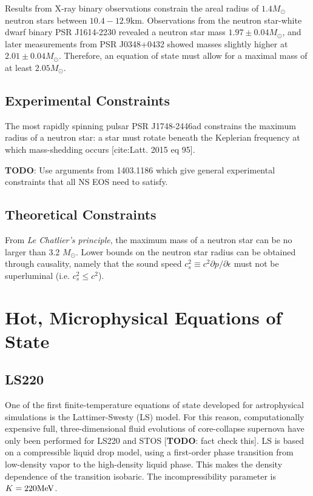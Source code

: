 Results from X-ray binary observations constrain the areal radius of $1.4M_\odot$ neutron stars between $10.4 - 12.9 \textrm{km}$.
Observations from the neutron star-white dwarf binary PSR J1614-2230 revealed a neutron star mass $1.97 \pm 0.04 M_\odot$, and later measurements from PSR J0348+0432 showed masses slightly higher at  $2.01 \pm 0.04 M_\odot$.  Therefore, an equation of state must allow for a maximal mass of at least $2.05 M_{\odot}$.

\subsection{Experimental Constraints}

The most rapidly spinning pulsar PSR J1748-2446ad constrains the maximum radius of a neutron star: a star must rotate beneath the Keplerian frequency at which mass-shedding occurs [cite:Latt. 2015 eq 95].

\textbf{TODO}: Use arguments from 1403.1186 which give general experimental constraints that all NS EOS need to satisfy. 

\subsection{Theoretical Constraints}

From \textit{Le Chatlier's principle}, the maximum mass of a neutron star can be no larger than 3.2 $M_\odot$.  Lower bounds on the neutron star radius can be obtained through causality, namely that the sound speed $c_s^2 \equiv c^2 \partial p / \partial \epsilon$ must not be superluminal (i.e. $c_s^2 \le c^2$).  

\section{Hot, Microphysical Equations of State}
\label{sec:nuclear-eos}

\subsection{LS220}
\label{sec:ls220}

One of the first finite-temperature equations of state developed for astrophysical simulations is the Lattimer-Swesty (LS) model.  For this reason, computationally expensive full, three-dimensional fluid evolutions of core-collapse supernova have only been performed for LS220 and STOS [\textbf{TODO}: fact check this].
LS is based on a compressible liquid drop model, using a first-order phase transition from low-density vapor to the high-density liquid phase.  This makes the density dependence of the transition isobaric.  The incompressibility parameter is $K = 220 {\rm MeV}$.

